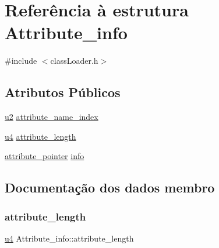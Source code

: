 \hypertarget{struct_attribute__info}{}\section{Referência à estrutura Attribute\+\_\+info}
\label{struct_attribute__info}


{\ttfamily \#include $<$class\+Loader.\+h$>$}

\subsection*{Atributos Públicos}
\begin{DoxyCompactItemize}
\item 
\hyperlink{util_8h_a55ef8d87fd202b8417704c089899c5b9}{u2} \hyperlink{struct_attribute__info_aa4440d705679a387fa1661affcc260fd}{attribute\+\_\+name\+\_\+index}
\item 
\hyperlink{util_8h_ae391a1d79bb0c8cbc283f0283e3c098b}{u4} \hyperlink{struct_attribute__info_a2d181b8a759aef7cdf0dac22a3d44854}{attribute\+\_\+length}
\item 
\hyperlink{unionattribute__pointer}{attribute\+\_\+pointer} \hyperlink{struct_attribute__info_af50e221b11ed1b84edbee3a06940b8eb}{info}
\end{DoxyCompactItemize}


\subsection{Documentação dos dados membro}
\mbox{\label{struct_attribute__info_a2d181b8a759aef7cdf0dac22a3d44854}} 
\subsubsection{\texorpdfstring{attribute\+\_\+length}{attribute\_length}}
{\footnotesize\ttfamily \hyperlink{util_8h_ae391a1d79bb0c8cbc283f0283e3c098b}{u4} Attribute\+\_\+info\+::attribute\+\_\+length}

\mbox{\label{struct_attribute__info_aa4440d705679a387fa1661affcc260fd}} 
